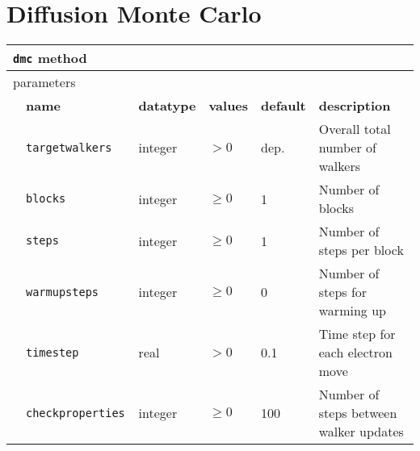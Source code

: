 \section{Diffusion Monte Carlo}
\label{sec:dmc}

\begin{table}[h]
\begin{center}
\begin{tabularx}{\textwidth}{l l l l l X }
\hline
\multicolumn{6}{l}{\texttt{dmc} method} \\
\hline
\multicolumn{2}{l}{parameters}  & \multicolumn{4}{l}{}\\
   &   \bfseries name     & \bfseries datatype & \bfseries values & \bfseries default   & \bfseries description \\
   &   \texttt{targetwalkers             } &  integer  & $> 0$ & dep.   & Overall total number of walkers \\
   &   \texttt{blocks              } &  integer  & $\ge 0$ & 1   & Number of blocks            \\
   &   \texttt{steps               } &  integer  & $\ge 0$ & 1   & Number of steps per block   \\
   &   \texttt{warmupsteps         } &  integer  & $\ge 0$ & 0   & Number of steps for warming up\\
   &   \texttt{timestep            } &  real     & $> 0$ & 0.1 & Time step for each electron move \\
   &   \texttt{checkproperties     } &  integer  & $\ge 0$ & 100   & Number of steps between walker updates  \\

\end{tabularx}
\end{center}
\end{table}

